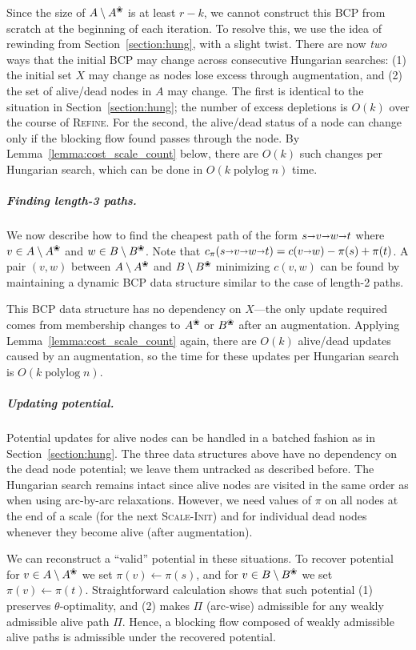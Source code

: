 \documentclass[a4paper,UKenglish,nolineno]{socg-lipics-v2019}
\makeatletter
\def\polylog{\mathop{\mathrm{polylog}}}
\def\arcto{\mathord\shortrightarrow}
\def\arc#1#2{#1\arcto#2}
\def\alive#1{{#1}^\text{\ding{96}}}
\def\dead#1{{#1} \setminus \alive{#1}}
\def\n@te#1{\textsf{\boldmath \textbf{$\langle\!\langle$#1$\rangle\!\rangle$}}\leavevmode}
\def\note#1{\textcolor{red}{\n@te{#1}}}
\makeatother
\begin{document}
Since the size of $\dead{A}$ is at least $r-k$, we cannot
construct this BCP from scratch at the beginning of each iteration.
To resolve this, we use the idea of rewinding from Section~\ref{section:hung},
with a slight twist.
There are now \emph{two} ways that the initial BCP may change across
consecutive Hungarian searches: (1) the initial set $X$ may change as nodes
lose excess through augmentation, and (2) the set of alive/dead nodes in $A$ may
change.
The first is identical to the situation in Section~\ref{section:hung};
the number of excess depletions is $O(k)$ over the course of \textsc{Refine}.
For the second, the alive/dead status of a node can change only if the
blocking flow found passes through the node.
By Lemma~\ref{lemma:cost_scale_count} below, there are $O(k)$ such changes per Hungarian search,
which can be done in $O(k\polylog n)$ time.

\subparagraph{Finding length-3 paths.}
We now describe how to find the cheapest path of the form $s \arcto v \arcto w \arcto t$
where $v \in \dead{A}$ and $w \in \dead{B}$.
Note that $c_\pi(s \arcto v \arcto w \arcto t) = c(\arc vw) - \pi(s) + \pi(t)$.
A pair $(v, w)$ between $\dead{A}$ and $\dead{B}$ minimizing $c(v, w)$
can be found by maintaining a dynamic BCP data structure similar to the
case of length-2 paths.

This BCP data structure has no dependency on $X$---the only update required comes from
membership changes to $\alive{A}$ or $\alive{B}$ after an augmentation.
Applying Lemma~\ref{lemma:cost_scale_count} again,
there are $O(k)$ alive/dead updates caused by an augmentation, so the time for
these updates per Hungarian search is $O(k\polylog n)$.

\subparagraph{Updating potential.}
Potential updates for alive nodes can be handled in a batched fashion as in Section~\ref{section:hung}.
The three data structures above have no dependency on the dead node potential;
we leave them untracked as described before.
The Hungarian search remains intact since alive nodes are visited
in the same order as when using arc-by-arc relaxations.
However, we need values of $\pi$ on all nodes at the end of a scale (for the
next \textsc{Scale-Init}) and for individual dead nodes whenever they become
alive (after augmentation).

We can reconstruct a ``valid'' potential in these situations.
To recover potential for $v \in \dead{A}$ we set $\pi(v) \gets \pi(s)$,
and for $v \in \dead{B}$ we set $\pi(v) \gets \pi(t)$.
Straightforward calculation shows that such potential (1) preserves $\theta$-optimality,
and (2) makes $\Pi$ (arc-wise) admissible for any weakly admissible alive path $\Pi$.
Hence, a blocking flow composed of weakly admissible alive paths is admissible
under the recovered potential.
\end{document}
